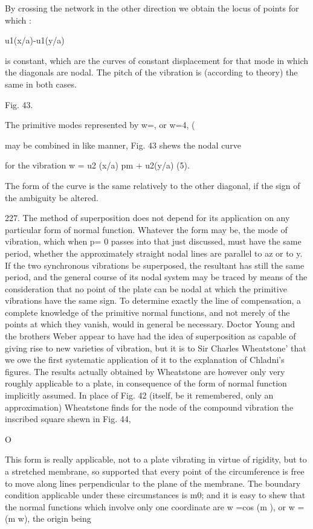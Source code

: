 By crossing the network in the other direction we obtain the locus of
points for which :

u1(x/a)-u1(y/a)

is constant, which are the curves of constant displacement for that mode
in which the diagonals are nodal. The pitch of the vibration is
(according to theory) the same in both cases.

Fig. 43.

The primitive modes represented by w=, or w=4, (

may be combined in like manner, Fig. 43 shews the nodal curve

for the vibration w = u2 (x/a) pm + u2(y/a) (5).

The form of the curve is the same relatively to the other diagonal, if
the sign of the ambiguity be altered.

227. The method of superposition does not depend for its application on
any particular form of normal function. Whatever the form may be, the
mode of vibration, which when p= 0 passes into that just discussed, must
have the same period, whether the approximately straight nodal lines are
parallel to az or to y. If the two synchronous vibrations be superposed,
the resultant has still the same period, and the general course of its
nodal system may be traced by means of the consideration that no point
of the plate can be nodal at which the primitive vibrations have the
same sign. To determine exactly the line of compensation, a complete
knowledge of the primitive normal functions, and not merely of the
points at which they vanish, would in general be necessary. Doctor Young
and the brothers Weber appear to have had the idea of superposition as
capable of giving rise to new varieties of vibration, but it is to Sir
Charles Wheatstone' that we owe the first systematic application of it
to the explanation of Chladni's figures. The results actually obtained
by Wheatstone are however only very roughly applicable to a plate, in
consequence of the form of normal function implicitly assumed. In place
of Fig. 42 (itself, be it remembered, only an approximation) Wheatstone
finds for the node of the compound vibration the inscribed square shewn
in Fig. 44,

O

This form is really applicable, not to a plate vibrating in virtue of
rigidity, but to a stretched membrane, so supported that every point of
the circumference is free to move along lines perpendicular to the plane
of the membrane. The boundary condition applicable under these
circumstances is m0; and it is easy to shew that the normal functions
which involve only one coordinate are w =cos (m ), or w = (m w), the
origin being

